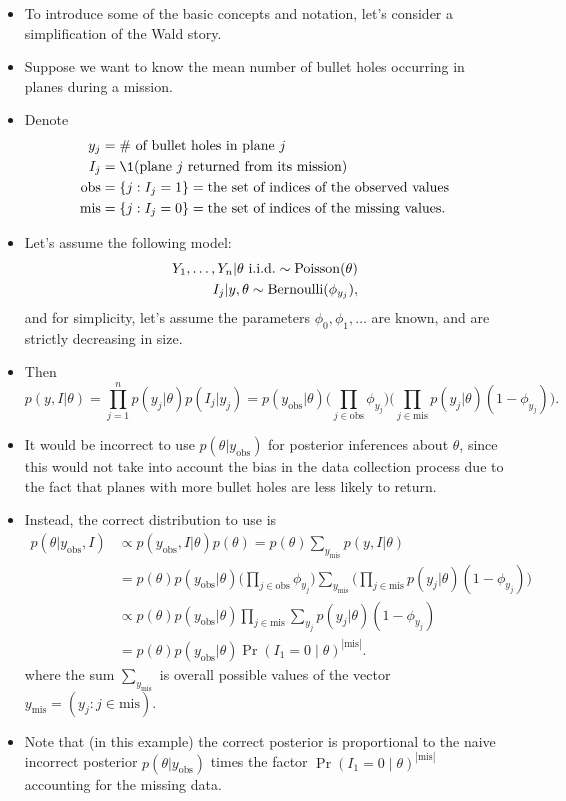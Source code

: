 \documentclass[12pt]{article}
\begin{document}
\begin{itemize}
\item
To introduce some of the basic concepts and notation, let's consider a simplification of the Wald story. 
\item Suppose we want to know the mean number of bullet holes occurring in planes during a mission. 
\item Denote
\begin{align*}
y_j & = \text{\# of bullet holes in plane $j$} \\
I_j & = \1(\text{plane $j$ returned from its mission})\\
\text{obs} & = \{j:I_j = 1 \}= \text{the set of indices of the observed values}\\
\text{mis} & = \{j:I_j = 0\}= \text{the set of indices of the missing values}.
\end{align*}
\item Let's assume the following model:
\begin{align*}
Y_1,\ldots,Y_n | \theta \text{ i.i.d.} \sim \operatorname*{Poisson}(\theta)\\
I_j | y,\theta \sim \operatorname*{Bernoulli}(\phi_{y_j}),
\end{align*}
and for simplicity, let's assume the parameters $\phi_0, \phi_1,\ldots$ are known, and are  strictly decreasing in size.
\item Then
$$ p(y,I | \theta) = \prod_{j = 1}^n p(y_j | \theta) p(I_j | y_j) = p(y_{\text{obs}} | \theta) \Big(\prod_{j \in\text{obs}}\phi_{y_j} \Big)
\Big(\prod_{j \in\text{mis}}p(y_j | \theta) (1 -\phi_{y_j}) \Big). $$
\item It would be incorrect to use $p(\theta | y_{\text{obs}})$ for posterior inferences about $\theta$, since this would not take into account the bias in the data collection process due to the fact that planes with more bullet holes are less likely to return.
\item Instead,  the correct distribution to use is
\begin{align*}
p(\theta | y_{\text{obs}},I) & \propto p(y_{\text{obs}},I | \theta) p(\theta)= p(\theta) \sum_{y_{\text{mis}}} p(y,I | \theta)\\
& =p(\theta) p(y_\text{obs} | \theta)\Big(\prod_{j \in\text{obs}}\phi_{y_j} \Big)\sum_{y_\text{mis}}
\Big(\prod_{j \in\text{mis}}p(y_j | \theta) (1 -\phi_{y_j}) \Big)\\
& \propto p(\theta) p(y_\text{obs} | \theta) 
\prod_{j \in\text{mis}}\sum_{y_j}p(y_j | \theta) (1 -\phi_{y_j})\\
& =p(\theta) p(y_\text{obs} | \theta) \Pr(I_1 = 0 \mid \theta)^{| \text{mis} |}.
\end{align*}
where the sum $\sum_{y_\text{mis}}$ is overall possible values of the vector $y_{\text{mis}} = (y_j:j \in \text{mis})$.
\item Note that (in this example) the correct posterior is proportional to the naive  incorrect posterior $p(\theta | y_\text{obs})$ times the factor $ \Pr(I_1 = 0 \mid \theta)^{| \text{mis} |}$ accounting for the missing data.
\end{itemize}
\end{document}
